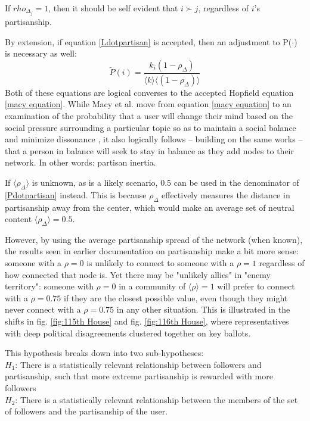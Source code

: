\documentclass[preprint,review,12pt]{elsarticle}
\begin{document}
If $rho_{\Delta_j} = 1$, then it should be self evident that $i \succ j$, regardless of $i$'s partisanship. 

By extension, if equation \ref{Ldotpartisan} is accepted, then an adjustment to P($\cdot$) is necessary as well:
\begin{equation}
\label{Pdotpartisan}
        \tilde{P}(i)= \frac{k_i(1-\rho_{\Delta})}{\langle k \rangle \langle (1-\rho_{\Delta}) \rangle}
\end{equation}
Both of these equations are logical converses to the accepted Hopfield equation \ref{macy equation}. While Macy et al.  move from equation \ref{macy equation} to an examination of the probability that a user will change their mind based on the social pressure surrounding a particular topic so as to maintain a social balance and minimize dissonance \cite{macy2003polarization}, it also logically follows -- building on the same works \cite{kitts1999structural,heider1982psychology,cartwright1956structural,hopfield1982neural,hopfield1985neural,nowak1998toward} -- that a person in balance will seek to stay in balance as they add nodes to their network. In other words: partisan inertia.

If $\langle \rho_{\Delta} \rangle$ is unknown, as is a likely scenario, 0.5 can be used in the denominator of \ref{Pdotpartisan} instead. This is because $\rho_{\Delta}$ effectively measures the distance in partisanship away from the center, which would make an average set of neutral content $\langle \rho_{\Delta} \rangle = 0.5$. 

However, by using the average partisanship spread of the network (when known), the results seen in earlier documentation on partisanship make a bit more sense: someone with a $\rho = 0$ is unlikely to connect to someone with a $\rho = 1$ regardless of how connected that node is. Yet there may be "unlikely allies" in "enemy territory": someone with $\rho = 0$ in a community of $\langle \rho \rangle=1$ will prefer to connect with a $\rho = 0.75$ if they are the closest possible value, even though they might never connect with a $\rho = 0.75$ in any other situation. This is illustrated in the shifts in fig. \ref{fig:115th House} and fig. \ref{fig:116th House}, where representatives with deep political disagreements clustered together on key ballots.

This hypothesis breaks down into two sub-hypotheses: \\
\textbf{$H_1$}: There is a statistically relevant relationship between followers and partisanship, such that more extreme partisanship is rewarded with more followers \\
\textbf{$H_2$}: There is a statistically relevant relationship between the members of the set of followers and the partisanship of the user.\\
\end{document}
